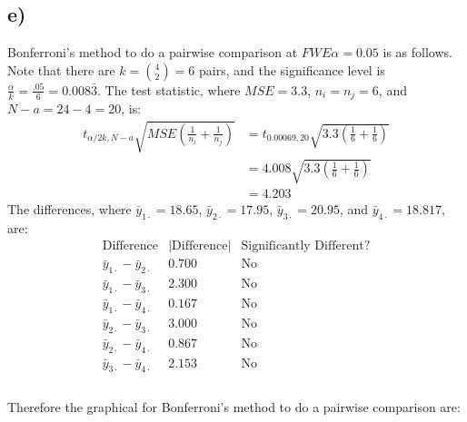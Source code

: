 \documentclass{article}
\begin{document}
\subsection*{e)}
Bonferroni's method to do a pairwise comparison at $FWE\alpha = 0.05$ is as follows.
Note that there are $k = \binom{4}{2} = 6$ pairs, and the significance level is $\frac{\alpha}{k} = \frac{.05}{6} = 0.008\bar{3}$.
The test statistic, where $MSE = 3.3$, $n_i = n_j = 6$, and $N - a = 24 - 4 = 20$, is:
\begin{align*}
  t_{\alpha/2k , N-a} \sqrt{MSE(\frac{1}{n_i} + \frac{1}{n_j})}&=  t_{0.00069,20} \sqrt{3.3(\frac{1}{6} + \frac{1}{6})} \\
              &= 4.008 \sqrt{3.3(\frac{1}{6} + \frac{1}{6})} \\
              &= 4.203
\end{align*}
The differences, where
$\bar{y}_{1 \cdot} = 18.65$, $\bar{y}_{2 \cdot} = 17.95$, $\bar{y}_{3 \cdot} = 20.95$, and $\bar{y}_{4 \cdot} = 18.817$, are:
\begin{equation*}
  \begin{array}{c|c|c}
    \text{Difference} & \left|  \text{Difference} \right| & \text{Significantly Different?} \\
      \hline
      \bar{y}_{1 \cdot} - \bar{y}_{2 \cdot} & 0.700 & \text{No} \\
      \bar{y}_{1 \cdot} - \bar{y}_{3 \cdot} & 2.300 & \text{No} \\
      \bar{y}_{1 \cdot} - \bar{y}_{4 \cdot} & 0.167 & \text{No} \\
      \bar{y}_{2 \cdot} - \bar{y}_{3 \cdot} & 3.000 & \text{No} \\
      \bar{y}_{2 \cdot} - \bar{y}_{4 \cdot} & 0.867 & \text{No} \\
      \bar{y}_{3 \cdot} - \bar{y}_{4 \cdot} & 2.153 & \text{No} \\

  \end{array}
\end{equation*}\\
Therefore the graphical for Bonferroni's method to do a pairwise comparison are: \\
\vspace{12pt}
\\
\end{document}
